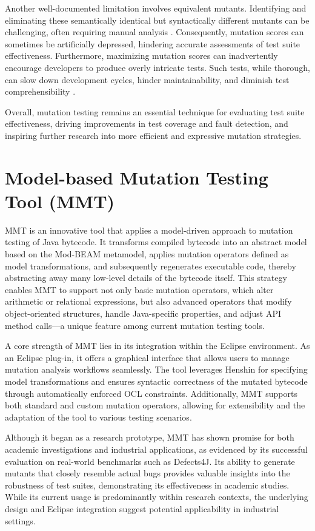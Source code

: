 \documentclass[12pt,a4paper]{article}
\begin{document}
Another well-documented limitation involves equivalent mutants. Identifying
and eliminating these semantically identical but syntactically different
mutants can be challenging, often requiring manual analysis
\cite{jia_analysis_2011}. Consequently, mutation scores can sometimes be
artificially depressed, hindering accurate assessments of test suite
effectiveness. Furthermore, maximizing mutation scores can inadvertently
encourage developers to produce overly intricate tests. Such tests, while
thorough, can slow down development cycles, hinder maintainability, and
diminish test comprehensibility \cite{offutt_mutation_2001,jia_analysis_2011}.

Overall, mutation testing remains an essential technique for evaluating test
suite effectiveness, driving improvements in test coverage and fault
detection, and inspiring further research into more efficient and expressive
mutation strategies.

\newpage
\section{Model-based Mutation Testing Tool (MMT)}

MMT is an innovative tool that applies a model-driven approach to mutation
testing of Java bytecode. It transforms compiled bytecode into an abstract
model based on the Mod-BEAM metamodel, applies mutation operators defined as
model transformations, and subsequently regenerates executable code, thereby
abstracting away many low-level details of the bytecode itself. This strategy
enables MMT to support not only basic mutation operators, which alter
arithmetic or relational expressions, but also advanced operators that modify
object-oriented structures, handle Java-specific properties, and adjust API
method calls—a unique feature among current mutation testing tools.

A core strength of MMT lies in its integration within the Eclipse
environment. As an Eclipse plug-in, it offers a graphical interface that
allows users to manage mutation analysis workflows seamlessly. The tool
leverages Henshin for specifying model transformations and ensures syntactic
correctness of the mutated bytecode through automatically enforced OCL
constraints. Additionally, MMT supports both standard and custom mutation
operators, allowing for extensibility and the adaptation of the tool to
various testing scenarios.

Although it began as a research prototype, MMT has shown promise for both
academic investigations and industrial applications, as evidenced by its
successful evaluation on real-world benchmarks such as Defects4J. Its ability
to generate mutants that closely resemble actual bugs provides valuable
insights into the robustness of test suites, demonstrating its effectiveness
in academic studies. While its current usage is predominantly within research
contexts, the underlying design and Eclipse integration suggest potential
applicability in industrial settings.
\end{document}
